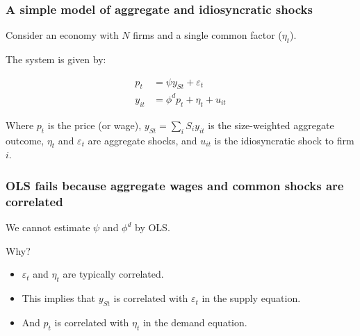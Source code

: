 \documentclass[aspectratio=169,11pt]{beamer}
\begin{document}
\begin{frame}
    \frametitle{A simple model of aggregate and idiosyncratic shocks}

    Consider an economy with $N$ firms and a single common factor ($\eta_t$).

    \vspace{0.8cm}
    The system is given by:

    \vspace{0.5cm}
    \begin{align}
        p_t    & = \psi y_{St} + \varepsilon_t \tag{38}  \\[0.5cm]
        y_{it} & = \phi^d p_t + \eta_t + u_{it} \tag{39}
    \end{align}

    \vspace{0.8cm}
    Where $p_t$ is the price (or wage), $y_{St} = \sum_i S_i y_{it}$ is the size-weighted aggregate outcome, $\eta_t$ and $\varepsilon_t$ are aggregate shocks, and $u_{it}$ is the idiosyncratic shock to firm $i$.

\end{frame}

\begin{frame}
    \frametitle{OLS fails because aggregate wages and common shocks are correlated}

    \vspace{0.5cm}
    {\Large
        We cannot estimate $\psi$ and $\phi^d$ by OLS.
    }

    \vspace{1cm}
    {\Large
        Why?
    }

    \vspace{0.5cm}
    \begin{itemize}
        \item $\varepsilon_t$ and $\eta_t$ are typically correlated.
        \item This implies that $y_{St}$ is correlated with $\varepsilon_t$ in the supply equation.
        \item And $p_t$ is correlated with $\eta_t$ in the demand equation.
    \end{itemize}

\end{frame}
\end{document}
